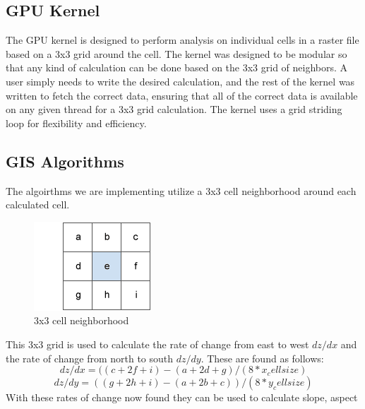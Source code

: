 \documentclass[journal]{IEEEtran}
\begin{document}
    \subsection{GPU Kernel}
    The GPU kernel is designed to perform analysis on individual cells in a
    raster file based on a 3x3 grid around the cell. The kernel was designed to
    be modular so that any kind of calculation can be done based on the 3x3
    grid of neighbors. A user simply needs to write the desired calculation,
    and the rest of the kernel was written to fetch the correct data, ensuring
    that all of the correct data is available on any given thread for a 3x3
    grid calculation. The kernel uses a grid striding loop for flexibility and
    efficiency\cite{grid_stride}.
    \subsection{GIS Algorithms}
    The algoirthms we are implementing utilize a 3x3 cell neighborhood around each 
    calculated cell. 
    \begin{figure}
        \includegraphics[width=\linewidth]{GIS grid.gif}
        \caption{3x3 cell neighborhood}
        \label{GIS grid}
    \end{figure}
    This 3x3 grid is used to calculate the rate of change from east to west \(dz/dx\)
    and the rate of change from north to south \(dz/dy\). These are found as follows:
    \[dz/dx = ((c + 2f + i) - (a + 2d + g) / (8 * x_cellsize)\]
    \[dz/dy = ((g + 2h + i) - (a + 2b + c)) / ( 8 * y_cellsize)\]
    With these rates of change now found they can be used to calculate slope, aspect
\end{document}
